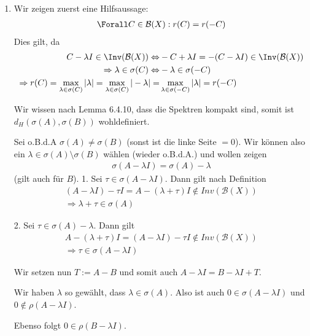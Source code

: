 \begin{solution}
\begin{enumerate}[label = (\alph*)]

\item
Wir zeigen zuerst eine Hilfsaussage:
\begin{align}\label{Lemmachen}
  \Forall C \in \mathcal{B}(X): r(C) = r(-C)
\end{align}
Dies gilt, da
\begin{align*}
  C - \lambda I \in \Inv(\mathcal{B}(X)) \Leftrightarrow & -C + \lambda I = -(C - \lambda I) \in \Inv(\mathcal{B}(X)) \\
  \Rightarrow \lambda \in \sigma (C) \Leftrightarrow & -\lambda \in \sigma (-C) \\
  \Rightarrow r(C) = \max_{\lambda \in \sigma (C)} |\lambda| = \max_{\lambda \in \sigma (C)} |-\lambda| = & \max_{\lambda \in \sigma (-C)} |\lambda| = r(-C)
\end{align*}

Wir wissen nach Lemma 6.4.10, dass die Spektren kompakt sind, somit ist $d_H(\sigma(A), \sigma(B))$ wohldefiniert.

Sei o.B.d.A $\sigma(A) \neq \sigma(B)$ (sonst ist die linke Seite $=0$). Wir können also ein $\lambda \in \sigma(A) \setminus \sigma(B)$ wählen (wieder o.B.d.A.) und wollen zeigen
\begin{align}\label{minuslambda}
  \sigma(A-\lambda I) = \sigma(A) - \lambda
\end{align}
(gilt auch für $B$).
1. Sei $\tau \in \sigma(A-\lambda I)$. Dann gilt nach Definition
\begin{align*}
  (A-\lambda I) - \tau I = A - (\lambda + \tau) I \notin Inv(\mathcal{B}(X)) \\
  \Rightarrow \lambda + \tau \in \sigma(A)
\end{align*}

2. Sei $\tau \in \sigma(A) - \lambda$. Dann gilt
\begin{align*}
  A - (\lambda + \tau) I = (A - \lambda I) -\tau I \notin Inv(\mathcal{B}(X)) \\
  \Rightarrow \tau \in \sigma(A - \lambda I)
\end{align*}

Wir setzen nun $T := A - B$ und somit auch $A- \lambda I = B - \lambda I + T$.

Wir haben $\lambda$ so gewählt, dass $\lambda \in \sigma(A)$. Also ist auch $0 \in \sigma(A - \lambda I)$ und $0 \notin \rho(A - \lambda I)$.

Ebenso folgt $0 \in \rho(B - \lambda I)$.


\end{enumerate}
\end{solution}
